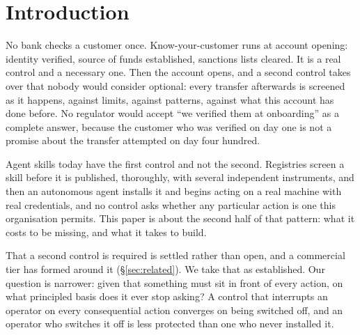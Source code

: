 \documentclass[10pt]{article}
\begin{document}
\begin{abstract}
We also set out what sits outside each layer's view, including our own: a gate that
reads actions does not see harm that never becomes one. Those gaps do not coincide,
which is why we think the layers compose rather than compete.

We offer one design for a control point at that gap: a deterministic resolver
(no model in the decision path; 67.6\,ms median end to end through the current CLI
hook, almost all of it process spawn) feeding a per-(resource, class) trust
ledger whose promotion thresholds are derived from an operator's own stated risk
tolerance rather than asserted. The common flat rule of
``ten clean approvals'' cannot exclude a true failure rate as high as 25.9\% at 95\%
confidence, and demands 3--15$\times$ less evidence than the operator's own stated
policy requires. We argue
agent-skill safety is a composition of two different questions, not a contest
between two detectors, and we report where our own layer fails as precisely as
where it helps.
\end{abstract}

\section{Introduction}
\label{sec:intro}

No bank checks a customer once. Know-your-customer runs at account opening: identity
verified, source of funds established, sanctions lists cleared. It is a real control
and a necessary one. Then the account opens, and a second control takes over that
nobody would consider optional: every transfer afterwards is screened as it
happens, against limits, against patterns, against what this account has done
before. No regulator would accept ``we verified them at onboarding'' as a complete
answer, because the customer who was verified on day one is not a promise about the
transfer attempted on day four hundred.

Agent skills today have the first control and not the second. Registries screen a
skill before it is published, thoroughly, with several independent instruments, and
then an autonomous agent installs it and begins acting on a real machine with real
credentials, and no control asks whether any particular action is one this
organisation permits. This paper is about the second half of that pattern: what it
costs to be missing, and what it takes to build.

That a second control is required is settled rather than open, and a commercial tier
has formed around it (\S\ref{sec:related}). We take that as established. Our question
is narrower: given that something must sit in front of every action, on what
principled basis does it ever stop asking? A control that interrupts an operator on
every consequential action converges on being switched off, and an operator who
switches it off is less protected than one who never installed it.
\end{document}
